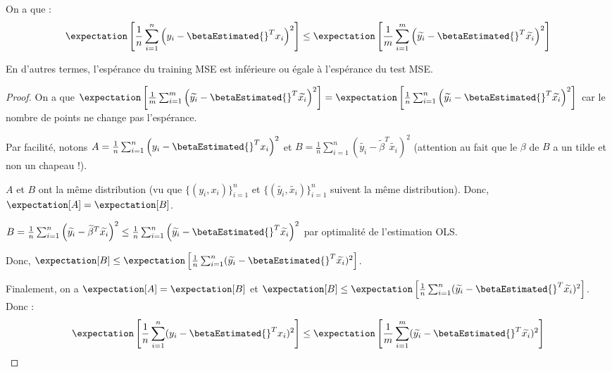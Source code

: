         \begin{theorem}
            On a que :
                \[
                    \expectation\left[\frac{1}{n}\sum_{i=1}^n \left(y_i - \betaEstimated{}^T x_i\right)^2\right] \leq \expectation\left[\frac{1}{m} \sum_{i=1}^m \left(\widetilde{y_i} - \betaEstimated{}^T \widetilde{x_i}\right)^2\right]
                \]

            En d'autres termes, l'espérance du training MSE est inférieure ou égale à l'espérance du test MSE.
        \end{theorem}
        \begin{proof}
            On a que \(\expectation\left[\frac{1}{m} \sum_{i=1}^m \left(\widetilde{y_i} - \betaEstimated{}^T \widetilde{x_i}\right)^2\right] = \expectation\left[\frac{1}{n} \sum_{i=1}^n \left(\widetilde{y_i} - \betaEstimated{}^T \widetilde{x_i}\right)^2\right]\) car le nombre de points ne change pas l'espérance.

            Par facilité, notons \(A = \frac{1}{n}\sum_{i=1}^n \left(y_i - \betaEstimated{}^T x_i\right)^2\) et \(B = \frac{1}{n} \sum_{i=1}^n \left(\widetilde{y_i} - \widetilde{\beta}^T \widetilde{x_i}\right)^2\) (attention au fait que le \(\beta\) de \(B\) a un tilde et non un chapeau !).

            \(A\) et \(B\) ont la même distribution (vu que \(\{(y_i, x_i)\}_{i=1}^n\) et \(\{(\widetilde{y_i}, \widetilde{x_i})\}_{i=1}^n\) suivent la même distribution). Donc, \(\expectation[A] = \expectation[B]\).

            \(B = \frac{1}{n}\sum_{i=1}^n \left(\widetilde{y_i} - \widetilde{\beta}^T \widetilde{x_i}\right)^2 \leq \frac{1}{n} \sum_{i=1}^n \left(\widetilde{y_i} - \betaEstimated{}^T \widetilde{x_i}\right)^2\) par optimalité de l'estimation OLS.

            Donc, \(\expectation[B] \leq \expectation\left[\frac{1}{n} \sum_{i=1}^n (\widetilde{y_i} - \betaEstimated{}^T \widetilde{x_i})^2\right]\).

            Finalement, on a \(\expectation[A] = \expectation[B]\) et \(\expectation[B] \leq \expectation\left[\frac{1}{n} \sum_{i=1}^n (\widetilde{y_i} - \betaEstimated{}^T \widetilde{x_i})^2\right]\). Donc :
            \[
                \expectation\left[\frac{1}{n} \sum_{i=1}^n (y_i - \betaEstimated{}^T x_i)^2\right] \leq \expectation\left[\frac{1}{m} \sum_{i=1}^m (\widetilde{y_i} - \betaEstimated{}^T \widetilde{x_i})^2\right]
            \]
        \end{proof}

